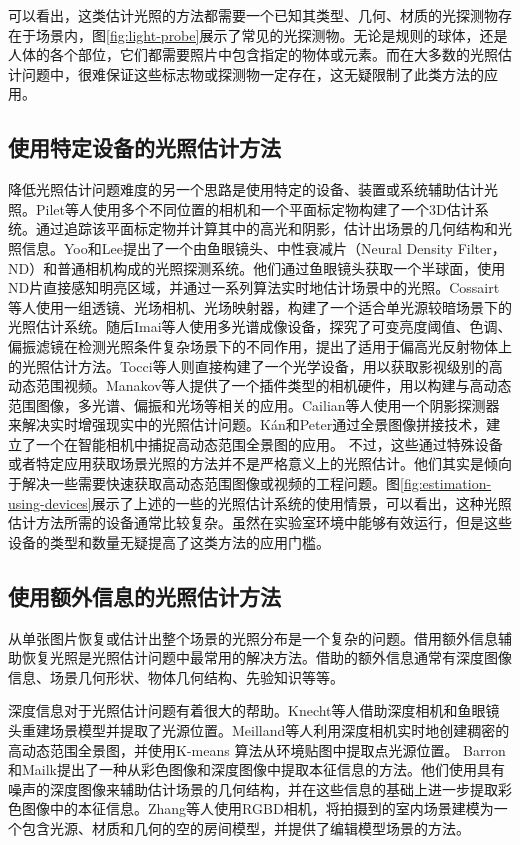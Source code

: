 可以看出，这类估计光照的方法都需要一个已知其类型、几何、材质的光探测物存在于场景内，图\ref{fig:light-probe}展示了常见的光探测物。无论是规则的球体，还是人体的各个部位，它们都需要照片中包含指定的物体或元素。而在大多数的光照估计问题中，很难保证这些标志物或探测物一定存在，这无疑限制了此类方法的应用。

\subsection{使用特定设备的光照估计方法}

降低光照估计问题难度的另一个思路是使用特定的设备、装置或系统辅助估计光照。Pilet等人\cite{pilet2006all}使用多个不同位置的相机和一个平面标定物构建了一个3D估计系统。通过追踪该平面标定物并计算其中的高光和阴影，估计出场景的几何结构和光照信息。Yoo和Lee\cite{yoo2008real}提出了一个由鱼眼镜头、中性衰减片（Neural Density Filter，ND）和普通相机构成的光照探测系统。他们通过鱼眼镜头获取一个半球面，使用ND片直接感知明亮区域，并通过一系列算法实时地估计场景中的光照。Cossairt等人\cite{cossairt2008light}使用一组透镜、光场相机、光场映射器，构建了一个适合单光源较暗场景下的光照估计系统。随后Imai等人\cite{imai2011estimation}使用多光谱成像设备，探究了可变亮度阈值、色调、偏振滤镜在检测光照条件复杂场景下的不同作用，提出了适用于偏高光反射物体上的光照估计方法。Tocci等人\cite{tocci2011versatile}则直接构建了一个光学设备，用以获取影视级别的高动态范围视频。Manakov等人\cite{manakov2013reconfigurable}提供了一个插件类型的相机硬件，用以构建与高动态范围图像，多光谱、偏振和光场等相关的应用。Cailian等人\cite{calian2013shading}使用一个阴影探测器来解决实时增强现实中的光照估计问题。K\'an和Peter\cite{kan2015interactive}通过全景图像拼接技术，建立了一个在智能相机中捕捉高动态范围全景图的应用。
不过，这些通过特殊设备或者特定应用获取场景光照的方法并不是严格意义上的光照估计。他们其实是倾向于解决一些需要快速获取高动态范围图像或视频的工程问题。图\ref{fig:estimation-using-devices}展示了上述的一些的光照估计系统的使用情景，可以看出，这种光照估计方法所需的设备通常比较复杂。虽然在实验室环境中能够有效运行，但是这些设备的类型和数量无疑提高了这类方法的应用门槛。

\subsection{使用额外信息的光照估计方法}
从单张图片恢复或估计出整个场景的光照分布是一个复杂的问题。借用额外信息辅助恢复光照是光照估计问题中最常用的解决方法。借助的额外信息通常有深度图像信息、场景几何形状、物体几何结构、先验知识等等。

深度信息对于光照估计问题有着很大的帮助。Knecht等人\cite{knecht2012reciprocal}借助深度相机和鱼眼镜头重建场景模型并提取了光源位置。Meilland等人\cite{meilland20133d}利用深度相机实时地创建稠密的高动态范围全景图，并使用K-means 算法从环境贴图中提取点光源位置。 Barron和Mailk\cite{barron2013intrinsic}提出了一种从彩色图像和深度图像中提取本征信息的方法。他们使用具有噪声的深度图像来辅助估计场景的几何结构，并在这些信息的基础上进一步提取彩色图像中的本征信息。Zhang等人\cite{zhang2016emptying}使用RGBD相机，将拍摄到的室内场景建模为一个包含光源、材质和几何的空的房间模型，并提供了编辑模型场景的方法。

